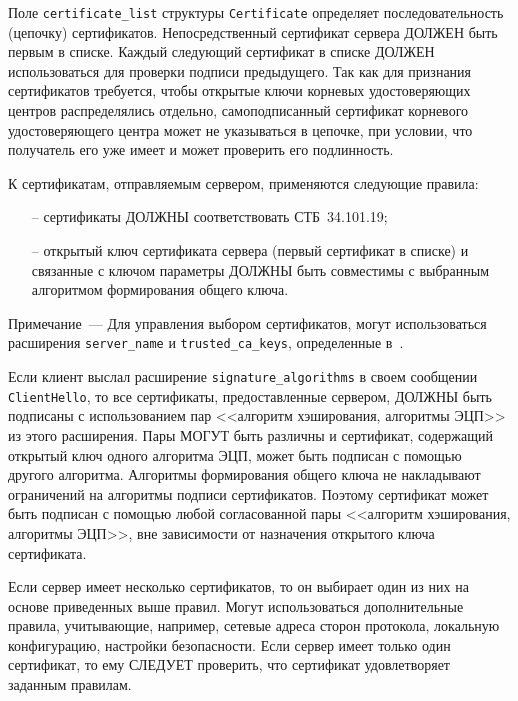 Поле \lstinline{certificate_list} структуры \lstinline{Certificate}
определяет последовательность (цепочку) сертификатов. Непосредственный
сертификат сервера ДОЛЖЕН быть первым в списке. Каждый следующий сертификат
в списке ДОЛЖЕН использоваться для проверки подписи предыдущего. Так как
для признания сертификатов требуется, чтобы открытые ключи корневых
удостоверяющих центров распределялись отдельно, самоподписанный сертификат
корневого удостоверяющего центра может не указываться в цепочке, при
условии, что получатель его уже имеет и может проверить его подлинность.

К сертификатам, отправляемым сервером, применяются следующие правила:
\begin{itemize}
\item[--]
сертификаты ДОЛЖНЫ соответствовать СТБ~34.101.19;

\item[--]
открытый ключ сертификата сервера (первый сертификат в списке) и 
связанные с ключом параметры ДОЛЖНЫ быть совместимы с выбранным 
алгоритмом формирования общего ключа. 
\end{itemize}

\begin{note}
Примечание~--- Для управления выбором сертификатов, могут использоваться 
расширения \lstinline{server_name} и \lstinline{trusted_ca_keys}, 
определенные в~\cite{RFC6066}.
\end{note} 

Если клиент выслал расширение \lstinline{signature_algorithms} в своем сообщении 
\lstinline{ClientHello}, то все сертификаты, предоставленные сервером, ДОЛЖНЫ быть 
подписаны с использованием пар <<алгоритм хэширования, алгоритмы ЭЦП>> из 
этого расширения. Пары МОГУТ быть различны и сертификат, содержащий 
открытый ключ одного алгоритма ЭЦП, может быть подписан с помощью другого 
алгоритма. Алгоритмы формирования общего ключа не накладывают ограничений 
на алгоритмы подписи сертификатов. Поэтому сертификат может быть подписан 
с помощью любой согласованной пары <<алгоритм хэширования, алгоритмы ЭЦП>>, 
вне зависимости от назначения открытого ключа сертификата. 

Если сервер имеет несколько сертификатов, то он выбирает один из них на 
основе приведенных выше правил. Могут использоваться дополнительные 
правила, учитывающие, например, сетевые адреса сторон протокола, локальную 
конфигурацию, настройки безопасности. Если сервер имеет только один 
сертификат, то ему СЛЕДУЕТ проверить, что сертификат удовлетворяет 
заданным правилам. 

